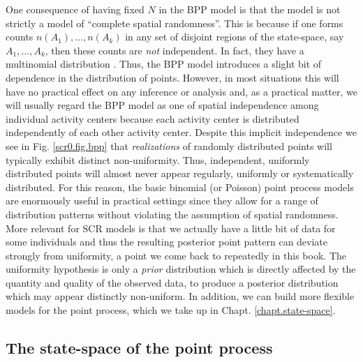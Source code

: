 One consequence of having fixed $N$ in the BPP model is that the model
is not strictly a model of ``complete spatial randomness''. This is
because if one forms counts $n(A_{1}),\ldots, n(A_{k})$ in any set of
disjoint regions of the state-space, say $A_{1}, \ldots, A_{k}$, then
these counts are {\it not} independent.  In fact, they have a
multinomial distribution \citep[see][p. 61]{illian_etal:2008}. Thus,
the BPP model introduces a slight bit of dependence in the
distribution of points. However, in most situations this will have no
practical effect on any inference or analysis and, as a practical
matter, we will usually regard the BPP model as one of spatial
independence among individual activity centers because each activity
center is distributed independently of each other activity
center. Despite this implicit independence we see in
Fig. \ref{scr0.fig.bpp} that {\it realizations} of randomly
distributed points will typically exhibit distinct
non-uniformity. Thus, independent, uniformly distributed points will
almost never appear regularly, uniformly or systematically
distributed. For this reason, the basic binomial (or Poisson) point
process models are enormously useful in practical settings since they
allow for a range of distribution patterns without violating the
assumption of spatial randomness.  More relevant for SCR models is
that we actually have a little bit of data for some individuals and
thus the resulting posterior point pattern can deviate strongly from
uniformity, a point we come back to repeatedly in this book.  The
uniformity hypothesis is only a {\it prior} distribution which is
directly affected by the quantity and quality of the observed data, to
produce a posterior distribution which may appear distinctly
non-uniform.  In addition, we can build more flexible models for the
point process, which we take up in Chapt. \ref{chapt.state-space}.


\subsection{The state-space of the point process}


